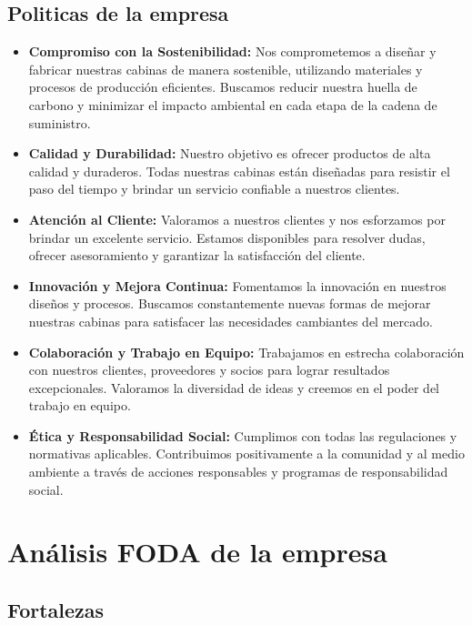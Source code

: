 \subsection{Politicas de la empresa}


\begin{itemize}
    \item \textbf{Compromiso con la Sostenibilidad:} Nos comprometemos a diseñar y fabricar nuestras cabinas de manera sostenible, utilizando materiales y procesos de producción eficientes. Buscamos reducir nuestra huella de carbono y minimizar el impacto ambiental en cada etapa de la cadena de suministro.
    
    \item \textbf{Calidad y Durabilidad:} Nuestro objetivo es ofrecer productos de alta calidad y duraderos. Todas nuestras cabinas están diseñadas para resistir el paso del tiempo y brindar un servicio confiable a nuestros clientes.
    
    \item \textbf{Atención al Cliente:} Valoramos a nuestros clientes y nos esforzamos por brindar un excelente servicio. Estamos disponibles para resolver dudas, ofrecer asesoramiento y garantizar la satisfacción del cliente.
    
    \item \textbf{Innovación y Mejora Continua:} Fomentamos la innovación en nuestros diseños y procesos. Buscamos constantemente nuevas formas de mejorar nuestras cabinas para satisfacer las necesidades cambiantes del mercado.
    
    \item \textbf{Colaboración y Trabajo en Equipo:} Trabajamos en estrecha colaboración con nuestros clientes, proveedores y socios para lograr resultados excepcionales. Valoramos la diversidad de ideas y creemos en el poder del trabajo en equipo.
    
    \item \textbf{Ética y Responsabilidad Social:} Cumplimos con todas las regulaciones y normativas aplicables. Contribuimos positivamente a la comunidad y al medio ambiente a través de acciones responsables y programas de responsabilidad social.
\end{itemize}


\section{Análisis FODA de la empresa}

\subsection{Fortalezas}


